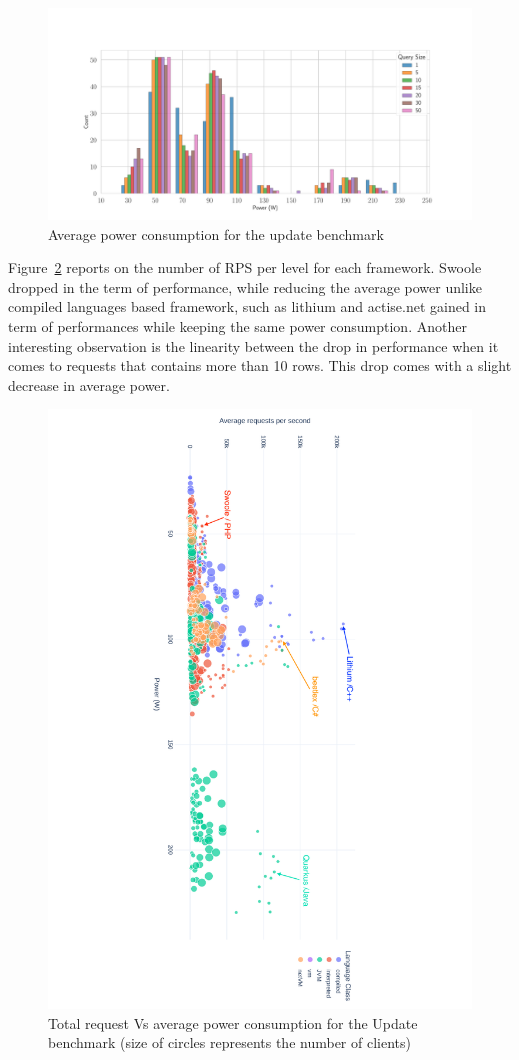 \begin{figure}[hbt]
    \centering
    \includegraphics[width=\textwidth,height=\textheight,keepaspectratio]{imgs/histogram_av_power_cpu_update}
    \caption{Average power consumption for the update benchmark}
    \label{fig:av_power_update}
\end{figure}

Figure~\ref{fig:power_requests_update} reports on the number of RPS per level for each framework.
Swoole dropped in the term of performance, while reducing the average power unlike compiled languages based framework, such as lithium and actise.net gained in term of performances while keeping the same power consumption.
Another interesting observation is the linearity between the drop in performance when it comes to requests that contains more than 10 rows.
This drop comes with a slight decrease in average power.

\begin{figure}[hbt]
    \includegraphics[height=\textwidth,width=\textheight,keepaspectratio,angle=90]{imgs/power_requests_update}
    \caption{Total request Vs average power consumption for the Update benchmark (size of circles represents the number of clients)}
    \label{fig:power_requests_update}
\end{figure}

